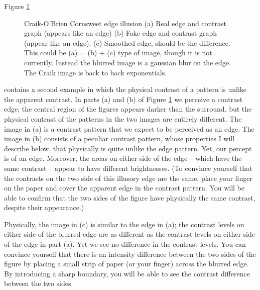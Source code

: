 Figure \ref{fig4:craikedge}
\begin{figure}
\centerline{
}
\centerline{
}
\centerline{
}
\centerline{
}
\centerline{
}
\centerline{
}
\caption{
Craik-O'Brien Cornsweet edge illusion 
(a) Real edge and contrast graph (appears like an edge)
(b) Fake edge and contrast graph (appear like an edge).
(c) Smoothed edge, should be the difference.
This could be (a) = (b) + (c) type of image, though it is not currently.
Instead the blurred image is a gaussian blur on the edge.
The Craik image is back to back exponentials.
\label{fig4:craikedge}
}
\end{figure}
contains a second example in which the physical contrast
of a pattern is unlike the apparent contrast.
In parts (a) and (b) of Figure \ref{fig4:craikedge} we perceive a contrast edge;
the central region of the figures appears darker than the surround.
but the physical
contrast of the patterns in the two images are entirely different.
The image in (a) is a contrast pattern that
we expect to be perceived as an edge.
The image in (b) consists of a peculiar contrast pattern,
whose properties I will describe below,
that physically is quite unlike the edge pattern.
Yet, our percept is of an edge.
Moreover, the areas on either side of the edge -- which
have the same contrast -- appear to have different brightnesses.
(To convince yourself that the contrasts on the two side
of this illusory edge are the same, place your finger
on the paper and cover the apparent edge in the contrast pattern.
You will be able to confirm that the two sides
of the figure have physically the same contrast, despite their appearance.)

Physically, the image in (c) is similar to the edge in (a);
the contrast levels on either side of the blurred edge
are as different as the contrast levels on either side of the
edge in part (a).
Yet we see no difference in the contrast levels.
You can convince yourself that there is an intensity
difference between the two sides of the figure
by placing a small strip of paper
(or your finger) across the blurred edge.
By introducing a sharp boundary,
you will be able to see the contrast difference between the two sides.

